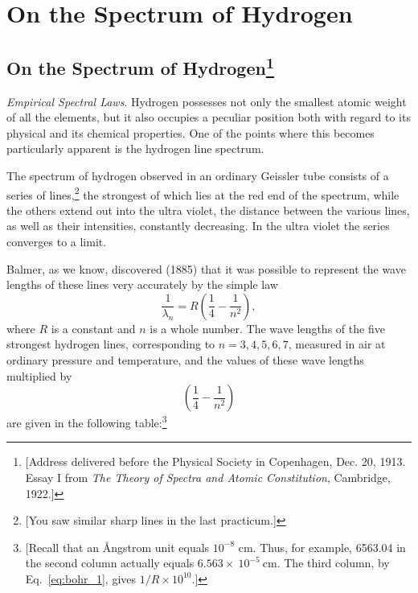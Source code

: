 \chapter{On the Spectrum of Hydrogen}\label{ch:bohr}


\renewcommand{\theequation}{\arabic{equation}}

\section*{On the Spectrum of Hydrogen\footnote{{[}Address delivered before the
  Physical Society in Copenhagen, Dec. 20, 1913. Essay I from \emph{The
  Theory of Spectra and Atomic Constitution}, Cambridge, 1922.{]}}}

\emph{Empirical Spectral Laws}. Hydrogen possesses not only the smallest
atomic weight of all the elements, but it also occupies a peculiar
position both with regard to its physical and its chemical properties.
One of the points where this becomes particularly apparent is the
hydrogen line spectrum.

The spectrum of hydrogen observed in an ordinary Geissler tube consists
of a series of lines,\footnote{{[}You saw similar sharp lines in the
  last practicum.{]}} the strongest of which lies at the red end of the
spectrum, while the others extend out into the ultra violet, the
distance between the various lines, as well as their intensities,
constantly decreasing. In the ultra violet the series converges to a
limit.

Balmer, as we know, discovered (1885) that it was possible to represent
the wave lengths of these lines very accurately by the simple law
%
\begin{equation}\label{eq:bohr_1}
\frac{1}{\lambda_n} = R\left(\frac{1}{4} - \frac{1}{n^2}\right),
\end{equation}
%
where $R$ is a constant and $n$ is a whole number. The wave
lengths of the five strongest hydrogen lines, corresponding to $n
= 3, 4, 5, 6, 7$, measured in air at ordinary pressure and temperature,
and the values of these wave lengths multiplied by
%
\begin{equation*}
\left(\frac{1}{4} - \frac{1}{n^2}\right)
\end{equation*}
%
are given in the following table:\footnote{{[}Recall that an Ångstrom
  unit equals $10^{-8}$ cm. Thus, for example, 6563.04 in the second column
  actually equals $6.563 \times\  10^{-5}\ \text{cm}$. The third column,
  by Eq.\ \eqref{eq:bohr_1}, gives $1/R \times 10^{10}$.{]}}

